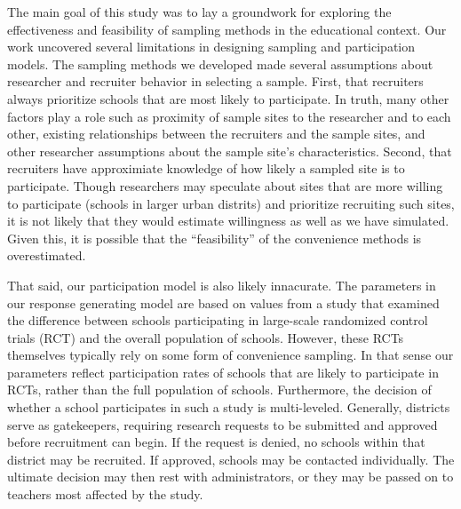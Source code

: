 \documentclass[man,floatsintext]{apa6}
\begin{document}
The main goal of this study was to lay a groundwork for exploring the effectiveness and feasibility of sampling methods in the educational context. Our work uncovered several limitations in designing sampling and participation models. The sampling methods we developed made several assumptions about researcher and recruiter behavior in selecting a sample. First, that recruiters always prioritize schools that are most likely to participate. In truth, many other factors play a role such as proximity of sample sites to the researcher and to each other, existing relationships between the recruiters and the sample sites, and other researcher assumptions about the sample site's characteristics. Second, that recruiters have approximiate knowledge of how likely a sampled site is to participate. Though researchers may speculate about sites that are more willing to participate (schools in larger urban distrits) and prioritize recruiting such sites, it is not likely that they would estimate willingness as well as we have simulated. Given this, it is possible that the \enquote{feasibility} of the convenience methods is overestimated.

That said, our participation model is also likely innacurate. The parameters in our response generating model are based on values from a study that examined the difference between schools participating in large-scale randomized control trials (RCT) and the overall population of schools. However, these RCTs themselves typically rely on some form of convenience sampling. In that sense our parameters reflect participation rates of schools that are likely to participate in RCTs, rather than the full population of schools. Furthermore, the decision of whether a school participates in such a study is multi-leveled. Generally, districts serve as gatekeepers, requiring research requests to be submitted and approved before recruitment can begin. If the request is denied, no schools within that district may be recruited. If approved, schools may be contacted individually. The ultimate decision may then rest with administrators, or they may be passed on to teachers most affected by the study.
\end{document}
